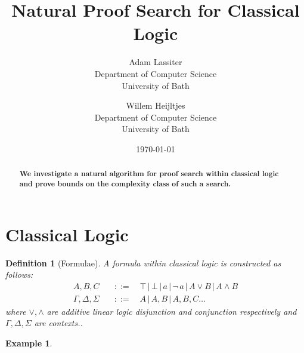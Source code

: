 \documentclass{article}
\title{Natural Proof Search for Classical Logic}
\author{Adam Lassiter\\Department of Computer Science\\University of Bath \and Willem Heijltjes\\Department of Computer Science\\University of Bath}
\date{\today}
\def\defeq{::=}
\theoremstyle{indented}
\newtheorem{definition}[sec-ctr]{Definition}
\newtheorem*{example*}{Example}
\begin{document}
    \maketitle
    \begin{abstract}
        \textbf{We investigate a natural algorithm for proof search within classical logic and prove bounds on the complexity class of such a search.}
    \end{abstract}




    \section{Classical Logic}

        \begin{definition}[Formulae]
            A \textit{formula} within classical logic is constructed as follows:
            \begin{align*}
                A, B, C                \quad &\defeq \quad \top \,|\, \bot \,|\, a \,|\, \neg\, a \,|\, A \vee B \,|\, A \wedge B \\
                \Gamma, \Delta, \Sigma \quad &\defeq \quad A \,|\, A,B \,|\, A,B,C \ldots
            \end{align*}
            where $\vee, \wedge$ are additive linear logic disjunction and conjunction respectively and $\Gamma, \Delta, \Sigma$ are contexts..
        \end{definition}

        \begin{example*}
        \end{example*}
\end{document}
